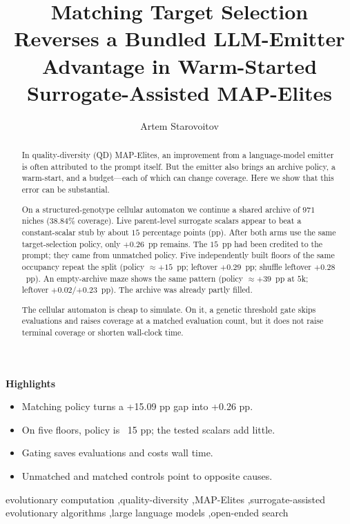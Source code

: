 \documentclass[preprint,12pt]{elsarticle}
\newenvironment{highlights}{%
    \par\noindent\textbf{Highlights}\par
    \begin{itemize}
  }{\end{itemize}}%
\begin{document}
\begin{frontmatter}

\title{Matching Target Selection Reverses a Bundled {LLM}-Emitter Advantage in Warm-Started Surrogate-Assisted {MAP}-{E}lites}

\author{Artem Starovoitov}
\address{Independent Engineer, Moscow, Russia}

\begin{abstract}
In quality-diversity (QD) MAP-Elites, an improvement from a language-model emitter is often attributed to the prompt itself. But the emitter also brings an archive policy, a warm-start, and a budget---each of which can change coverage. Here we show that this error can be substantial.

On a structured-genotype cellular automaton we continue a shared archive of $971$ niches ($38.84\%$ coverage). Live parent-level surrogate scalars appear to beat a constant-scalar stub by about $15$ percentage points (pp). After both arms use the same target-selection policy, only $+0.26$~pp remains. The $15$~pp had been credited to the prompt; they came from unmatched policy. Five independently built floors of the same occupancy repeat the split (policy ${\approx}{+}15$~pp; leftover $+0.29$~pp; shuffle leftover $+0.28$~pp). An empty-archive maze shows the same pattern (policy ${\approx}{+}39$~pp at $5$k; leftover $+0.02$/$+0.23$~pp). The archive was already partly filled.

The cellular automaton is cheap to simulate. On it, a genetic threshold gate skips evaluations and raises coverage at a matched evaluation count, but it does not raise terminal coverage or shorten wall-clock time.
\end{abstract}

\begin{highlights}
\item Matching policy turns a +15.09 pp gap into +0.26 pp.
\item On five floors, policy is ~15 pp; the tested scalars add little.
\item Gating saves evaluations and costs wall time.
\item Unmatched and matched controls point to opposite causes.
\end{highlights}

\begin{keyword}
    evolutionary computation \sep quality-diversity \sep MAP-Elites \sep surrogate-assisted evolutionary algorithms \sep large language models \sep open-ended search
\end{keyword}

\end{frontmatter}
\end{document}
